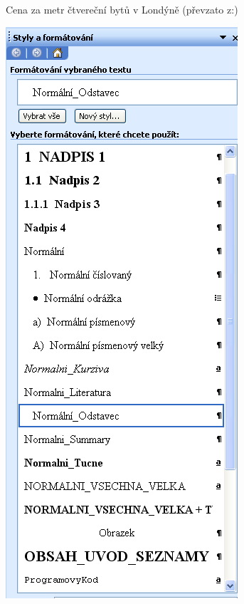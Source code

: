 \begin{figure}
\begin{subfigure}[b]{0.45\textwidth}
          \caption{Cena za metr čtvereční bytů v Londýně (převzato z:\cite{Fotheringham2002})}
          \label{fig2.1}
        \end{subfigure}%
        \quad %
        \begin{subfigure}[b]{0.45\textwidth}
          \centering
          \includegraphics[width=\textwidth]{./obrazky/obrazek_1.png}

\end{subfigure}
\end{figure}
